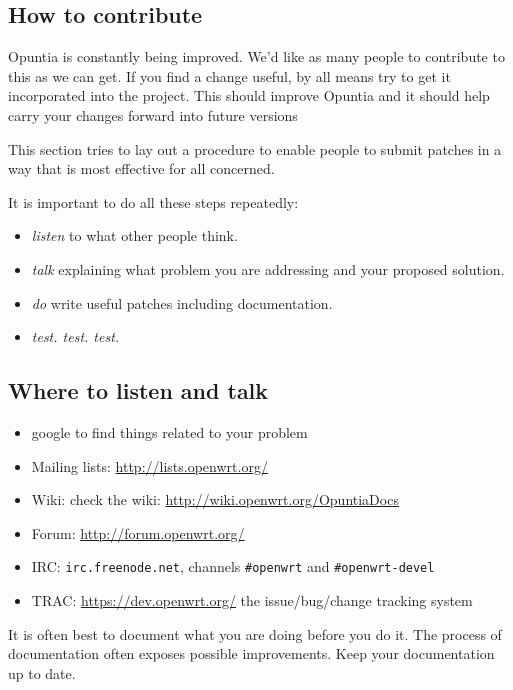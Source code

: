 \subsection{How to contribute}
Opuntia is constantly being improved.  We'd like as many people to contribute
to this as we can get. If you find a change useful, by all means try to get
it incorporated into the project. This should improve Opuntia and it should
help carry your changes forward into future versions

This section tries to lay out a procedure to enable people to submit patches
in a way that is most effective for all concerned.

It is important to do all these steps repeatedly:

\begin{itemize}
	\item \textit{listen} to what other people think.
	\item \textit{talk} explaining what problem you are addressing and your
		proposed solution.
	\item \textit{do} write useful patches including documentation.
    \item \textit{test. test. test.}
\end{itemize}

\subsection{Where to listen and talk}

\begin{itemize}
	\item google to find things related to your problem
	\item Mailing lists: \href{http://lists.openwrt.org/}{http://lists.openwrt.org/}
	\item Wiki: check the wiki: \href{http://wiki.openwrt.org/OpuntiaDocs}{http://wiki.openwrt.org/OpuntiaDocs}
	\item Forum: \href{http://forum.openwrt.org/}{http://forum.openwrt.org/}
	\item IRC: \texttt{irc.freenode.net}, channels \texttt{\#openwrt} and 
		\texttt{\#openwrt-devel}
	\item TRAC: \href{https://dev.openwrt.org/}{https://dev.openwrt.org/} the issue/bug/change tracking system
\end{itemize}

It is often best to document what you are doing before you do it.  The process
of documentation often exposes possible improvements.  Keep your documentation
up to date.

